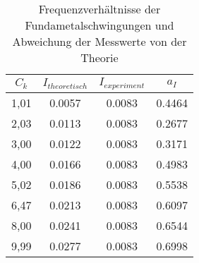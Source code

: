 \begin{table}[H]
    \centering
    \begin{tabular}{c c c c}
        \toprule
        $C_k$    &   $I_{theoretisch}$ & $I_{experiment}$ & $a_I$\\
        \midrule %
        1,01 & \num{0.0057}         & \num{0.0083}        & \num{0.4464}     \\        
        2,03 & \num{0.0113}         & \num{0.0083}        & \num{0.2677}     \\
        3,00 & \num{0.0122}         & \num{0.0083}        & \num{0.3171}     \\
        4,00 & \num{0.0166}         & \num{0.0083}        & \num{0.4983}     \\
        5,02 & \num{0.0186}         & \num{0.0083}        & \num{0.5538}     \\
        6,47 & \num{0.0213}         & \num{0.0083}        & \num{0.6097}     \\
        8,00 & \num{0.0241}         & \num{0.0083}        & \num{0.6544}     \\       
        9,99 & \num{0.0277}         & \num{0.0083}        & \num{0.6998}     \\
       \bottomrule
    \end{tabular}
    \caption{Frequenzverhältnisse der Fundametalschwingungen und Abweichung der Messwerte von der Theorie}
    \label{tab:Frequenzverhältnisse}
\end{table}


\label{sec:Auswertung}